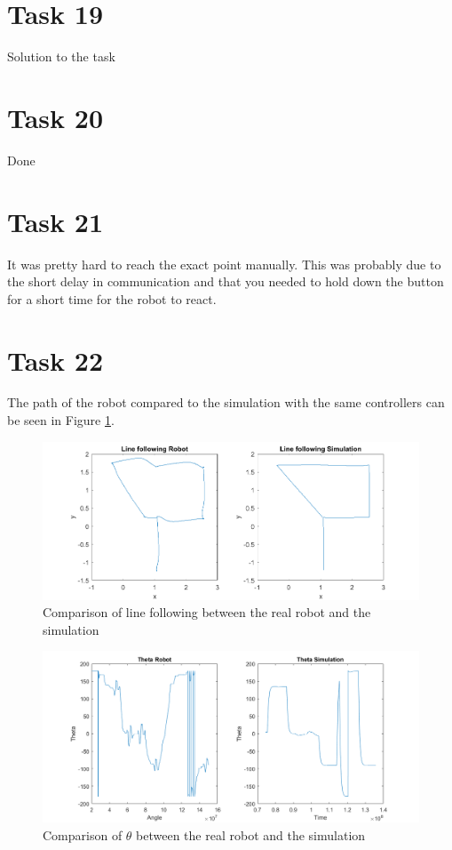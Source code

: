 \documentclass[a4paper,12pt,oneside,onecolumn]{article} %
\begin{document}
\section*{Task 19}

Solution to the task

\section*{Task 20}

Done

\section*{Task 21}

It was pretty hard to reach the exact point manually. This was probably due to the short delay in communication and that you needed to hold down the button for a short time for the robot to react.

\section*{Task 22}

The path of the robot compared to the simulation with the same controllers can be seen in Figure \ref{compare}.

\begin{figure}[H]
	\begin{center}
	\includegraphics[scale=0.5]{task22.png}
	\caption{Comparison of line following between the real robot and the simulation}
	\label{compare}
	\end{center}
\end{figure}


\begin{figure}[H]
	\begin{center}
	\includegraphics[scale=0.5]{task22angle.png}
	\caption{Comparison of  $\theta$ between the real robot and the simulation}
	\label{compareangle}
	\end{center}
\end{figure}
\end{document}
